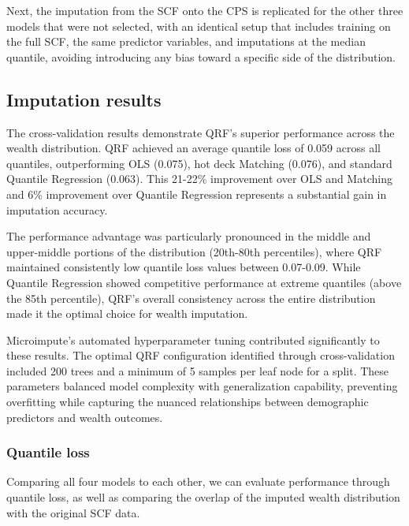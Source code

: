 Next, the imputation from the SCF onto the CPS is replicated for the other three models that were not selected, with an identical setup that includes training on the full SCF, the same predictor variables, and imputations at the median quantile, avoiding introducing any bias toward a specific side of the distribution. 

\subsection{Imputation results}

The cross-validation results demonstrate QRF's superior performance across the wealth distribution. QRF achieved an average quantile loss of 0.059 across all quantiles, outperforming OLS (0.075), hot deck Matching (0.076), and standard Quantile Regression (0.063). This 21-22\% improvement over OLS and Matching and 6\% improvement over Quantile Regression represents a substantial gain in imputation accuracy.

The performance advantage was particularly pronounced in the middle and upper-middle portions of the distribution (20th-80th percentiles), where QRF maintained consistently low quantile loss values between 0.07-0.09. While Quantile Regression showed competitive performance at extreme quantiles (above the 85th percentile), QRF's overall consistency across the entire distribution made it the optimal choice for wealth imputation.

Microimpute's automated hyperparameter tuning contributed significantly to these results. The optimal QRF configuration identified through cross-validation included 200 trees and a minimum of 5 samples per leaf node for a split. These parameters balanced model complexity with generalization capability, preventing overfitting while capturing the nuanced relationships between demographic predictors and wealth outcomes.

\subsubsection{Quantile loss}

Comparing all four models to each other, we can evaluate performance through quantile loss, as well as comparing the overlap of the imputed wealth distribution with the original SCF data. 

